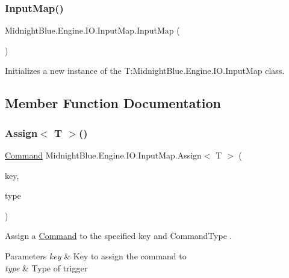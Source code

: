 \subsubsection{\texorpdfstring{Input\+Map()}{InputMap()}}
{\footnotesize\ttfamily Midnight\+Blue.\+Engine.\+I\+O.\+Input\+Map.\+Input\+Map (\begin{DoxyParamCaption}{ }\end{DoxyParamCaption})\hspace{0.3cm}{\ttfamily [inline]}}



Initializes a new instance of the T\+:\+Midnight\+Blue.\+Engine.\+I\+O.\+Input\+Map class. 



\subsection{Member Function Documentation}
\hypertarget{class_midnight_blue_1_1_engine_1_1_i_o_1_1_input_map_a51b8f423312c099cdcffc16bb751c9b6}{}\label{class_midnight_blue_1_1_engine_1_1_i_o_1_1_input_map_a51b8f423312c099cdcffc16bb751c9b6} 
\subsubsection{\texorpdfstring{Assign$<$ T $>$()}{Assign< T >()}}
{\footnotesize\ttfamily \hyperlink{class_midnight_blue_1_1_engine_1_1_i_o_1_1_command}{Command} Midnight\+Blue.\+Engine.\+I\+O.\+Input\+Map.\+Assign$<$ T $>$ (\begin{DoxyParamCaption}\item[{Keys}]{key,  }\item[{\hyperlink{namespace_midnight_blue_1_1_engine_1_1_i_o_a8bc3f159399ecadd590f7df1b54354b0}{Command\+Type}}]{type }\end{DoxyParamCaption})\hspace{0.3cm}{\ttfamily [inline]}}



Assign a \hyperlink{class_midnight_blue_1_1_engine_1_1_i_o_1_1_command}{Command} to the specified key and Command\+Type . 


\begin{DoxyParams}{Parameters}
{\em key} & Key to assign the command to\\
\hline
{\em type} & Type of trigger\\
\hline
\end{DoxyParams}

